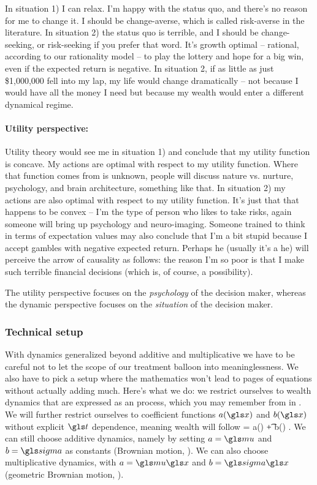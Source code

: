 In situation 1) I can relax. I'm happy with the status quo, and there's no reason for me to change it. 
I should be change-averse, which is called risk-averse in the literature. In situation 2) the 
status quo is terrible, and I should be change-seeking, or risk-seeking if you prefer that word.
It's growth optimal -- rational, according to our rationality model -- to play the lottery and hope for a big win, even if the expected return is negative. In situation 2, if as 
little as just \$1,000,000 fell into my lap, my life would change dramatically -- not because I would 
have all the money I need but because my wealth would enter a different dynamical regime. 

\paragraph{\bf Utility perspective:}
Utility theory would see me in situation 1) and conclude that my utility function 
is concave. My actions are optimal with respect to my utility function. Where that function 
comes from is unknown, people will discuss nature vs. nurture, psychology, and brain architecture, 
something like that. In situation 2) my actions are also optimal 
with respect to my utility function. It's just that that happens to be convex -- I'm the type of person 
who likes to take risks, again someone will bring up psychology and neuro-imaging. Someone 
trained to think in terms of expectation values may also conclude that I'm a bit stupid because I 
accept gambles with negative expected return. Perhaps he (usually it's a he) will perceive the 
arrow of causality as follows: the reason I'm so poor is that I make such terrible 
financial decisions (which is, of course, a possibility).

The utility perspective focuses on the {\it psychology} of the decision maker, 
whereas the dynamic perspective focuses on the {\it situation} of the decision maker. 

\subsubsection{Technical setup}
With dynamics generalized beyond additive and multiplicative we have to be careful not to 
let the scope of our treatment balloon into meaninglessness. We also have to pick a setup 
where the mathematics won't lead to pages of equations without actually adding much.
Here's what we do: we restrict ourselves to 
wealth dynamics that are expressed as an \Ito process, which you may remember from 
 in . We will further restrict ourselves to coefficient functions  
$a(\x)$ and $b(\x)$ without explicit $\t$ dependence, meaning wealth will follow 
\be
\gd\x = a(\x) \gd\t + b(\x) \gd\gW.
\ee
We can still choose additive dynamics, namely by setting $a=\gmu$ and $b=\gsigma$ as constants 
(Brownian motion, ). We can also choose multiplicative dynamics, with $a=\gmu\x$ and $b=\gsigma\x$ 
(geometric Brownian motion, ).

